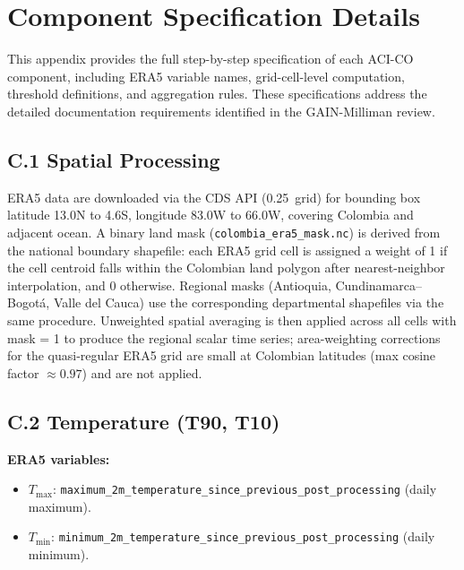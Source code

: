 \documentclass[12pt]{article}
\begin{document}
\section{Component Specification Details}\label{app:specs}
 
This appendix provides the full step-by-step specification of each ACI-CO component, including ERA5 variable names, grid-cell-level computation, threshold definitions, and aggregation rules. These specifications address the detailed documentation requirements identified in the GAIN-Milliman review.
 
\subsection*{C.1 Spatial Processing}
 
ERA5 data are downloaded via the CDS API (0.25\textdegree\ grid) for bounding box latitude 13.0\textdegree{}N to 4.6\textdegree{}S, longitude 83.0\textdegree{}W to 66.0\textdegree{}W, covering Colombia and adjacent ocean. A binary land mask (\texttt{colombia\_era5\_mask.nc}) is derived from the national boundary shapefile: each ERA5 grid cell is assigned a weight of 1 if the cell centroid falls within the Colombian land polygon after nearest-neighbor interpolation, and 0 otherwise. Regional masks (Antioquia, Cundinamarca--Bogot\'a, Valle del Cauca) use the corresponding departmental shapefiles via the same procedure. Unweighted spatial averaging is then applied across all cells with mask = 1 to produce the regional scalar time series; area-weighting corrections for the quasi-regular ERA5 grid are small at Colombian latitudes (max cosine factor $\approx 0.97$) and are not applied.
 
\subsection*{C.2 Temperature (T90, T10)}
 
\noindent\textbf{ERA5 variables:}
\begin{itemize}
\item $T_{\max}$: \texttt{maximum\_2m\_temperature\_since\_previous\_post\_processing} (daily maximum).
\item $T_{\min}$: \texttt{minimum\_2m\_temperature\_since\_previous\_post\_processing} (daily minimum).
\end{itemize}
 
\end{document}
